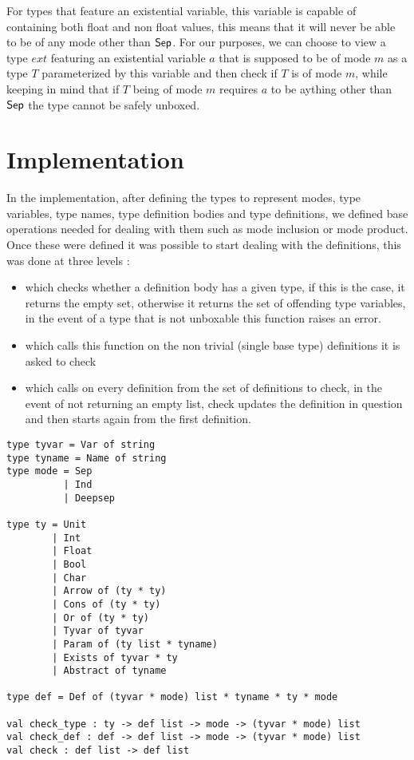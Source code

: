 \documentclass[a4]{article}
\begin{document}
For types that feature an existential variable, this variable is capable of containing both float and non float values, this means that it will never be able to be of any mode other than $\mathsf{Sep}$. For our purposes, we can choose to view a type $ext$ featuring an existential variable $a$ that is supposed to be of mode $m$ as a type $T$ parameterized by this variable and then check if $T$ is of mode $m$, while keeping in mind that if $T$ being of mode $m$ requires $a$ to be aything other than $\mathsf{Sep}$ the type cannot be safely unboxed.

\section{Implementation}


In the implementation, after defining the types to represent modes, type variables, type names, type definition bodies and type definitions, we defined base operations needed for dealing with them such as mode inclusion or mode product. Once these were defined it was possible to start dealing with the definitions, this was done at three levels :
\begin{itemize}
\item {} which checks whether a definition body has a given type, if this is the case, it returns the empty set, otherwise it returns the set of offending type variables, in the event of a type that is not unboxable this function raises an error.
\item {} which calls this function on the non trivial (single base type) definitions it is asked to check
\item {} which calls  on every definition from the set of definitions to check, in the event of  not returning an empty list, check updates the definition in question and then starts again from the first definition.
\end{itemize}

\begin{lstlisting}
type tyvar = Var of string
type tyname = Name of string
type mode = Sep
          | Ind
          | Deepsep

type ty = Unit
        | Int
        | Float
        | Bool
        | Char
        | Arrow of (ty * ty)
        | Cons of (ty * ty)
        | Or of (ty * ty)
        | Tyvar of tyvar
        | Param of (ty list * tyname)
        | Exists of tyvar * ty
        | Abstract of tyname

type def = Def of (tyvar * mode) list * tyname * ty * mode

val check_type : ty -> def list -> mode -> (tyvar * mode) list
val check_def : def -> def list -> mode -> (tyvar * mode) list
val check : def list -> def list
\end{lstlisting}
\end{document}

